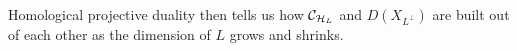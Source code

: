 \documentclass[12pt]{article}
\begin{document}
Homological projective duality then tells us how $\mathcal{C}_{\mathcal{H}_L}$ and $D(X_{L^\perp})$ are built out of each other as the dimension of $L$ grows and shrinks.


\end{document}
